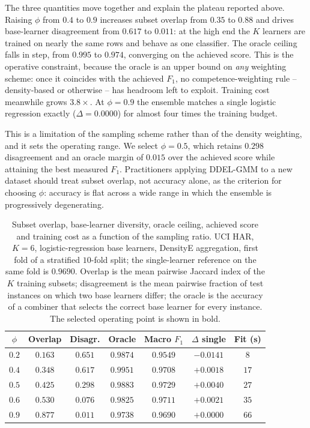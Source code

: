 \documentclass[lettersize,journal]{IEEEtran}
\begin{document}
	The three quantities move together and explain the plateau reported above. Raising
	$\phi$ from $0.4$ to $0.9$ increases subset overlap from $0.35$ to $0.88$ and drives
	base-learner disagreement from $0.617$ to $0.011$: at the high end the $K$ learners are
	trained on nearly the same rows and behave as one classifier. The oracle ceiling falls
	in step, from $0.995$ to $0.974$, converging on the achieved score. This is the
	operative constraint, because the oracle is an upper bound on \emph{any} weighting
	scheme: once it coincides with the achieved $F_1$, no competence-weighting rule --
	density-based or otherwise -- has headroom left to exploit. Training cost meanwhile
	grows $3.8\times$. At $\phi = 0.9$ the ensemble matches a single logistic regression
	exactly ($\Delta = 0.0000$) for almost four times the training budget.

	This is a limitation of the sampling scheme rather than of the density weighting, and it
	sets the operating range. We select $\phi = 0.5$, which retains $0.298$ disagreement and
	an oracle margin of $0.015$ over the achieved score while attaining the best measured
	$F_1$. Practitioners applying DDEL-GMM to a new dataset should treat subset overlap, not
	accuracy alone, as the criterion for choosing $\phi$: accuracy is flat across a wide
	range in which the ensemble is progressively degenerating.

	\begin{table}[!t]
		\centering
		\caption{Subset overlap, base-learner diversity, oracle ceiling, achieved score and
		training cost as a function of the sampling ratio. UCI HAR, $K = 6$,
		logistic-regression base learners, DensityE aggregation, first fold of a stratified
		$10$-fold split; the single-learner reference on the same fold is $0.9690$. Overlap is
		the mean pairwise Jaccard index of the $K$ training subsets; disagreement is the mean
		pairwise fraction of test instances on which two base learners differ; the oracle is
		the accuracy of a combiner that selects the correct base learner for every instance.
		The selected operating point is shown in bold.}
		\label{tab:diversity_cost}
		\begin{tabular}{ccccccc}
			\hline
			$\phi$ & Overlap & Disagr. & Oracle & Macro $F_1$ & $\Delta$ single & Fit (s) \\
			\hline
			$0.2$ & $0.163$ & $0.651$ & $0.9874$ & $0.9549$ & $-0.0141$ & $8$ \\
			$0.4$ & $0.348$ & $0.617$ & $0.9951$ & $0.9708$ & $+0.0018$ & $17$ \\
			$0.5$ & $0.425$ & $0.298$ & $0.9883$ & $\mathbf{0.9729}$ & $+0.0040$ & $27$ \\
			$0.6$ & $0.530$ & $0.076$ & $0.9825$ & $0.9711$ & $+0.0021$ & $35$ \\
			$0.9$ & $0.877$ & $0.011$ & $0.9738$ & $0.9690$ & $+0.0000$ & $66$ \\
			\hline
		\end{tabular}
	\end{table}
\end{document}
